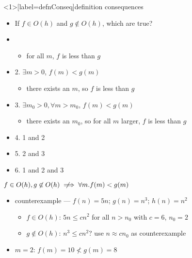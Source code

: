 \begin{frame}<1>[label=defnConseq]{definition consequences}
    \begin{itemize}
        \item If $f \in O(h)$ and $g \not\in O(h)$, which are true?
        \item {}
                \begin{itemize}
                \item for all $m$, $f$ is less than $g$
                \end{itemize}
        \item 2. $\exists m>0$, $f(m)<g(m)$
                \begin{itemize}
                \item there exists an $m$, so $f$ is less than $g$
                \end{itemize}
        \item 3. $\exists m_0>0, \forall m>m_0$, $f(m)<g(m)$
                \begin{itemize}
                \item there exists an $m_0$, so for all $m$ larger, $f$ is less than $g$
                \end{itemize}
        \item 4. 1 and 2
        \item 5. 2 and 3
        \item 6. 1 and 2 and 3
    \end{itemize}
\end{frame}

\newcommand{\notimplies}{%
  \mathrel{{\ooalign{\hidewidth$\not\phantom{=}$\hidewidth\cr$\implies$}}}}

\begin{frame}{\fontsize{16}{17}\selectfont $f\in O(h), g\not\in O(h) \notimplies \forall m. f(m)<g(m)$}
    \begin{itemize}
    \item counterexample --- $f(n) = 5n$; $g(n) = n^3$; $h(n) = n^2$ \\
        \begin{itemize}
            \item $f\in O(h)$: $5n\le c n^2$ for all $n>n_0$ with $c = 6$, $n_0 = 2$
            \item $g\not\in O(h)$: $n^3\le c n^2$? use $n\approx cn_0$ as counterexample
        \end{itemize}
     \item $m=2$: $f(m) = 10 \not< g(m) = 8$
    \end{itemize}
\end{frame}

